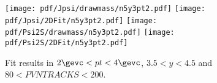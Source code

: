 \begin{figure}[H]
\begin{center}
\texttt{[image: pdf/Jpsi/drawmass/n5y3pt2.pdf]}
\texttt{[image: pdf/Jpsi/2DFit/n5y3pt2.pdf]}
\vspace*{-0.5cm}
\texttt{[image: pdf/Psi2S/drawmass/n5y3pt2.pdf]}
\texttt{[image: pdf/Psi2S/2DFit/n5y3pt2.pdf]}
\vspace*{-0.5cm}
\end{center}
\caption{Fit results in $2\gevc<pt<4\gevc$, $3.5<y<4.5$ and $80<PVNTRACKS<200$.}
\label{Fitn5y3pt2}
\end{figure}
